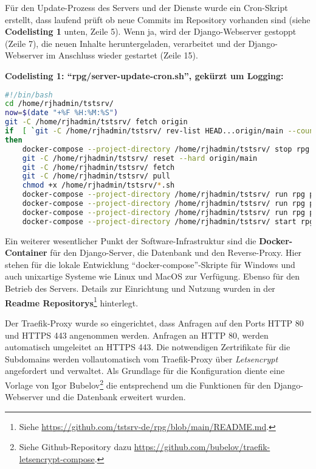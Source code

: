 Für den Update-Prozess des Servers und der Dienste wurde ein Cron-Skript erstellt, dass laufend prüft ob neue Commits im Repository vorhanden sind (siehe \textbf{Codelisting 1} unten, Zeile 5). Wenn ja, wird der Django-Webserver gestoppt (Zeile 7), die neuen Inhalte heruntergeladen, verarbeitet und der Django-Webserver im Anschluss wieder gestartet (Zeile 15). 

\textbf{Codelisting 1: \enquote{rpg/server-update-cron.sh}, gekürzt um Logging:}
\begin{lstlisting}[language=bash]
#!/bin/bash
cd /home/rjhadmin/tstsrv/
now=$(date "+%F %H:%M:%S")
git -C /home/rjhadmin/tstsrv/ fetch origin 
if  [ `git -C /home/rjhadmin/tstsrv/ rev-list HEAD...origin/main --count` != 0 ] 
then
    docker-compose --project-directory /home/rjhadmin/tstsrv/ stop rpg  
    git -C /home/rjhadmin/tstsrv/ reset --hard origin/main  
    git -C /home/rjhadmin/tstsrv/ fetch
    git -C /home/rjhadmin/tstsrv/ pull 
    chmod +x /home/rjhadmin/tstsrv/*.sh 
    docker-compose --project-directory /home/rjhadmin/tstsrv/ run rpg python rpg/manage.py makemigrations 
    docker-compose --project-directory /home/rjhadmin/tstsrv/ run rpg python rpg/manage.py migrate 
    docker-compose --project-directory /home/rjhadmin/tstsrv/ run rpg python rpg/manage.py loaddata db_sample_data.json 
    docker-compose --project-directory /home/rjhadmin/tstsrv/ start rpg 
\end{lstlisting}



Ein weiterer wesentlicher Punkt der Software-Infrastruktur sind die \textbf{Docker-Container} für den Django-Server, die Datenbank und den Reverse-Proxy. Hier stehen für die lokale Entwicklung \enquote{docker-compose}-Skripte für Windows und auch unixartige Systeme wie Linux und MacOS zur Verfügung. Ebenso für den Betrieb des Servers. Details zur Einrichtung und Nutzung wurden in der \textbf{Readme Repositorys}\footnote{Siehe \url{https://github.com/tstsrv-de/rpg/blob/main/README.md}.} hinterlegt. 


Der Traefik-Proxy wurde so eingerichtet, dass Anfragen auf den Ports HTTP 80 und HTTPS 443 angenommen werden. Anfragen an HTTP 80, werden automatisch umgeleitet an HTTPS 443. Die notwendigen Zertrifikate für die Subdomains werden vollautomatisch vom Traefik-Proxy über \textit{Letsencrypt} angefordert und verwaltet. Als Grundlage für die Konfiguration diente eine Vorlage von Igor Bubelov\footnote{Siehe Github-Repository dazu \url{https://github.com/bubelov/traefik-letsencrypt-compose}.} die entsprechend um die Funktionen für den Django-Webserver und die Datenbank erweitert wurden.


